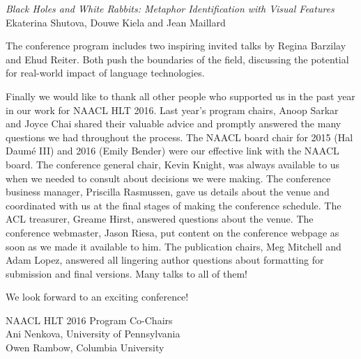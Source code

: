\noindent \emph{Black Holes and White Rabbits: Metaphor Identification with Visual Features}\\
Ekaterina Shutova, Douwe Kiela and Jean Maillard

The conference program includes two inspiring invited talks by Regina 
Barzilay and Ehud Reiter. Both push the boundaries of the field, discussing 
the potential for real-world impact of language technologies. 

Finally we would like to thank all other people who supported us in the past
year in our work for NAACL HLT 2016. Last year’s program chairs, Anoop 
Sarkar and Joyce Chai shared their valuable advice and promptly answered the
many questions we had throughout the process. The NAACL board chair for 2015
(Hal Daum\'{e} III) and 2016 (Emily Bender) were our effective link with the
NAACL board. The conference general chair, Kevin Knight, was always 
available to us when we needed to consult about decisions we were making. 
The conference business manager, Priscilla Rasmussen, gave us details about 
the venue and coordinated with us at the final stages of making the 
conference schedule. The ACL treasurer, Greame Hirst, answered questions 
about the venue. The conference webmaster, Jason Riesa, put content on the 
conference webpage as soon as we made it available to him. The publication 
chairs, Meg Mitchell and Adam Lopez, answered all lingering author 
questions about formatting for submission and final versions. Many talks to 
all of them!

We look forward to an exciting conference!

\vskip 0.3in
\noindent NAACL HLT 2016 Program Co-Chairs \\
Ani Nenkova, University of Pennsylvania\\
Owen Rambow, Columbia University

